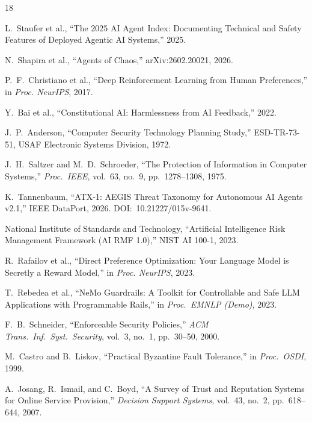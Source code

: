 \documentclass[journal]{IEEEtran}
\begin{document}
\begin{thebibliography}{18}

L.~Staufer et al., ``The 2025 AI Agent Index: Documenting Technical and Safety Features of Deployed Agentic AI Systems,'' 2025.

N.~Shapira et al., ``Agents of Chaos,'' arXiv:2602.20021, 2026.

P.~F.~Christiano et al., ``Deep Reinforcement Learning from Human Preferences,'' in \textit{Proc. NeurIPS}, 2017.

Y.~Bai et al., ``Constitutional AI: Harmlessness from AI Feedback,'' 2022.

J.~P.~Anderson, ``Computer Security Technology Planning Study,'' ESD-TR-73-51, USAF Electronic Systems Division, 1972.

J.~H.~Saltzer and M.~D.~Schroeder, ``The Protection of Information in Computer Systems,'' \textit{Proc.\ IEEE}, vol.~63, no.~9, pp.~1278--1308, 1975.

K.~Tannenbaum, ``ATX-1: AEGIS Threat Taxonomy for Autonomous AI Agents v2.1,'' IEEE DataPort, 2026. DOI:~10.21227/015v-9641.

National Institute of Standards and Technology, ``Artificial Intelligence Risk Management Framework (AI RMF 1.0),'' NIST AI 100-1, 2023.

R.~Rafailov et al., ``Direct Preference Optimization: Your Language Model is Secretly a Reward Model,'' in \textit{Proc. NeurIPS}, 2023.

T.~Rebedea et al., ``NeMo Guardrails: A Toolkit for Controllable and Safe LLM Applications with Programmable Rails,'' in \textit{Proc.\ EMNLP (Demo)}, 2023.

F.~B.~Schneider, ``Enforceable Security Policies,'' \textit{ACM Trans.\ Inf.\ Syst.\ Security}, vol.~3, no.~1, pp.~30--50, 2000.

M.~Castro and B.~Liskov, ``Practical Byzantine Fault Tolerance,'' in \textit{Proc.\ OSDI}, 1999.

A.~Josang, R.~Ismail, and C.~Boyd, ``A Survey of Trust and Reputation Systems for Online Service Provision,'' \textit{Decision Support Systems}, vol.~43, no.~2, pp.~618--644, 2007.


\end{thebibliography}
\end{document}

